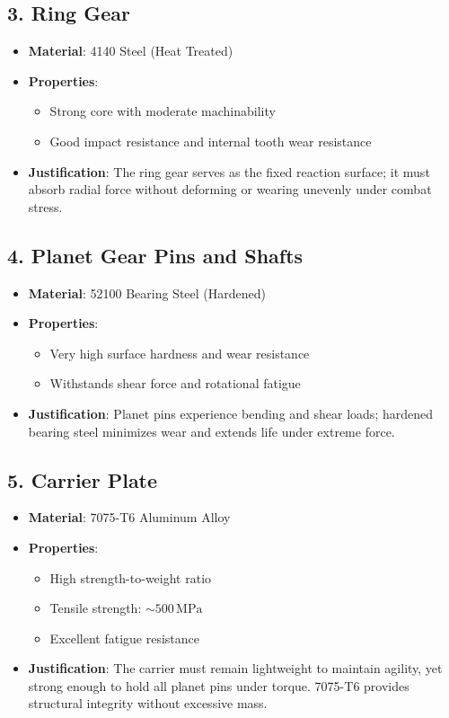 \documentclass[a4paper,12pt]{article}
\begin{document}
\subsection*{3. Ring Gear}
\begin{itemize}
    \item \textbf{Material}: 4140 Steel (Heat Treated)
    \item \textbf{Properties}:
        \begin{itemize}
            \item Strong core with moderate machinability
            \item Good impact resistance and internal tooth wear resistance
        \end{itemize}
    \item \textbf{Justification}: The ring gear serves as the fixed reaction surface; it must absorb radial force without deforming or wearing unevenly under combat stress.
\end{itemize}

\subsection*{4. Planet Gear Pins and Shafts}
\begin{itemize}
    \item \textbf{Material}: 52100 Bearing Steel (Hardened)
    \item \textbf{Properties}:
        \begin{itemize}
            \item Very high surface hardness and wear resistance
            \item Withstands shear force and rotational fatigue
        \end{itemize}
    \item \textbf{Justification}: Planet pins experience bending and shear loads; hardened bearing steel minimizes wear and extends life under extreme force.
\end{itemize}

\subsection*{5. Carrier Plate}
\begin{itemize}
    \item \textbf{Material}: 7075-T6 Aluminum Alloy
    \item \textbf{Properties}:
        \begin{itemize}
            \item High strength-to-weight ratio
            \item Tensile strength: \( \sim 500 \, \text{MPa} \)
            \item Excellent fatigue resistance
        \end{itemize}
    \item \textbf{Justification}: The carrier must remain lightweight to maintain agility, yet strong enough to hold all planet pins under torque. 7075-T6 provides structural integrity without excessive mass.
\end{itemize}
\end{document}
